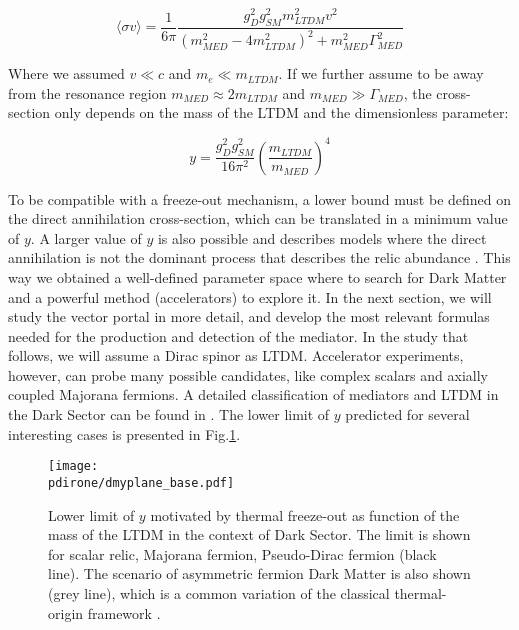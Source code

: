   \begin{equation}
    \label{eq:dm-cs-fo}
    \langle \sigma v \rangle = \frac{1}{6\pi}\frac{g^2_D g^2_{SM} m^2_{LTDM} v^2}{(m^2_{MED} - 4m^2_{LTDM})^2 + m^2_{MED}\Gamma^2_{MED}}
    \end{equation}

    
    Where we assumed $v \ll c$ and $m_e \ll m_{LTDM}$. If we further assume to be away from the resonance region $m_{MED} \approx 2m_{LTDM}$ and $m_{MED} \gg \Gamma_{MED}$, the cross-section only depends on the mass of the LTDM and the dimensionless parameter:

    \begin{equation}
      \label{eq:dmplane-y}
      y = \frac{g^2_D g^2_{SM}}{16 \pi^2} \left( \frac{m_{LTDM}}{m_{MED}} \right)^4
    \end{equation}

    To be compatible with a freeze-out mechanism, a lower bound must be defined on the direct annihilation cross-section, which can be translated in a minimum value of $y$. A larger value of $y$ is also possible and describes models where the direct annihilation is not the dominant process that describes the relic abundance \cite{battaglieri2017cosmic}. This way we obtained a well-defined parameter space where to search for Dark Matter and a powerful method (accelerators) to explore it. In the next section, we will study the vector portal in more detail, and develop the most relevant formulas needed for the production and detection of the mediator. In the study that follows, we will assume a Dirac spinor as LTDM. Accelerator experiments, however, can probe many possible candidates, like complex scalars and axially coupled Majorana fermions. A detailed classification of mediators and LTDM in the Dark Sector can be found in \cite{PhysRevD.92.123531}. The lower limit of $y$ predicted for several interesting cases is presented in Fig.\ref{fig:dmyplane-base}.

    \begin{figure}[bth!]
      \centering
      \texttt{[image: \\pdirone/dmyplane\_base.pdf]}
      \caption[Lower limit of $y$ in dark sector]{Lower limit of $y$ motivated by thermal freeze-out as function of the mass of the LTDM in the context of Dark Sector. The limit is shown for scalar relic, Majorana fermion, Pseudo-Dirac fermion (black line). The scenario of asymmetric fermion Dark Matter is also shown (grey line), which is a common variation of the classical thermal-origin framework \cite{battaglieri2017cosmic}.}
      \label{fig:dmyplane-base}
    \end{figure}

